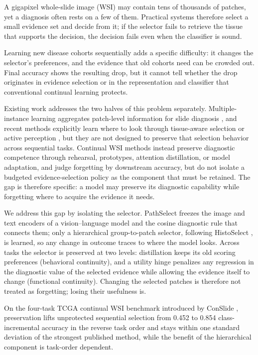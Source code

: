 \documentclass{article}
\begin{document}
A gigapixel whole-slide image (WSI) may contain tens of thousands of patches, yet a diagnosis often rests on a few of them. Practical systems therefore select a small evidence set and decide from it; if the selector fails to retrieve the tissue that supports the decision, the decision fails even when the classifier is sound.

Learning new disease cohorts sequentially adds a specific difficulty: it changes the selector's preferences, and the evidence that old cohorts need can be crowded out. Final accuracy shows the resulting drop, but it cannot tell whether the drop originates in evidence selection or in the representation and classifier that conventional continual learning protects.

Existing work addresses the two halves of this problem separately. Multiple-instance learning aggregates patch-level information for slide diagnosis \cite{ilse2018abmil,lu2021clam,shao2021transmil}, and recent methods explicitly learn where to look through tissue-aware selection \cite{huang2026histoselect} or active perception \cite{chen2026adaptivepath}, but they are not designed to preserve that selection behavior across sequential tasks. Continual WSI methods \cite{huang2023conslide,meseguer2024micil,gou2025qpmil,li2025akd,lee2025comel,bui2026mergeslide} instead preserve diagnostic competence through rehearsal, prototypes, attention distillation, or model adaptation, and judge forgetting by downstream accuracy, but do not isolate a budgeted evidence-selection policy as the component that must be retained. The gap is therefore specific: a model may preserve its diagnostic capability while forgetting where to acquire the evidence it needs.

We address this gap by isolating the selector. PathSelect freezes the image and text encoders of a vision--language model and the cosine diagnostic rule that connects them; only a hierarchical group-to-patch selector, following HistoSelect \cite{huang2026histoselect}, is learned, so any change in outcome traces to where the model looks. Across tasks the selector is preserved at two levels: distillation keeps its old scoring preferences (behavioral continuity), and a utility hinge penalizes any regression in the diagnostic value of the selected evidence while allowing the evidence itself to change (functional continuity). Changing the selected patches is therefore not treated as forgetting; losing their usefulness is.

On the four-task TCGA continual WSI benchmark introduced by ConSlide \cite{huang2023conslide}, preservation lifts unprotected sequential selection from 0.452 to 0.854 class-incremental accuracy in the reverse task order and stays within one standard deviation of the strongest published method, while the benefit of the hierarchical component is task-order dependent.
\end{document}
